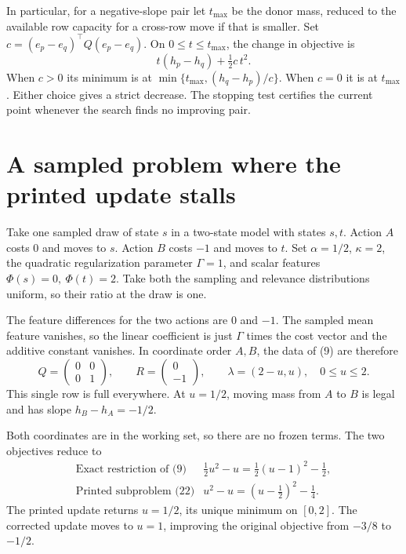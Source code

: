 \documentclass[12pt,a4paper]{article}
\begin{document}
In particular, for a negative-slope pair let \(t_{\max}\) be the donor
mass, reduced to the available row capacity for a cross-row move if
that is smaller. Set \(c=(e_p-e_q)^\top Q(e_p-e_q)\).
On \(0\le t\le t_{\max}\), the change in objective is
\[
 t(h_p-h_q)+\tfrac12 c\,t^2 .
\]
When \(c>0\) its minimum is at
\(\min\{t_{\max},(h_q-h_p)/c\}\). When \(c=0\) it is at \(t_{\max}\).
Either choice gives a strict decrease. The stopping test certifies the
current point whenever the search finds no improving pair.

\newpage
\section*{A sampled problem where the printed update stalls}
Take one sampled draw of state \(s\) in a two-state model with states
\(s,t\). Action \(A\) costs \(0\) and moves to \(s\). Action \(B\) costs
\(-1\) and moves to \(t\). Set \(\alpha=1/2\), \(\kappa=2\), the quadratic
regularization parameter \(\Gamma=1\), and scalar features
\(\Phi(s)=0,\ \Phi(t)=2\). Take both the sampling and relevance distributions
uniform, so their ratio at the draw is one.

The feature differences for the two actions are \(0\) and \(-1\).
The sampled mean feature vanishes, so the linear coefficient is just
\(\Gamma\) times the cost vector and the additive constant vanishes.
In coordinate order \(A,B\), the data of (9) are therefore
\[
 Q=\begin{pmatrix}0&0\\0&1\end{pmatrix},\qquad
 R=\begin{pmatrix}0\\-1\end{pmatrix},\qquad
 \lambda=(2-u,u),\quad 0\le u\le2 .
\]
This single row is full everywhere. At \(u=1/2\), moving mass from
\(A\) to \(B\) is legal and has slope \(h_B-h_A=-1/2\).

Both coordinates are in the working set, so there are no frozen terms.
The two objectives reduce to
\[
 \begin{array}{ll}
 \text{Exact restriction of (9)} & \tfrac12u^2-u
      =\tfrac12(u-1)^2-\tfrac12,\\[3pt]
 \text{Printed subproblem (22)} & u^2-u
      =(u-\tfrac12)^2-\tfrac14 .
 \end{array}
\]
The printed update returns \(u=1/2\), its unique minimum on \([0,2]\).
The corrected update moves to \(u=1\), improving the original objective
from \(-3/8\) to \(-1/2\).
\end{document}
